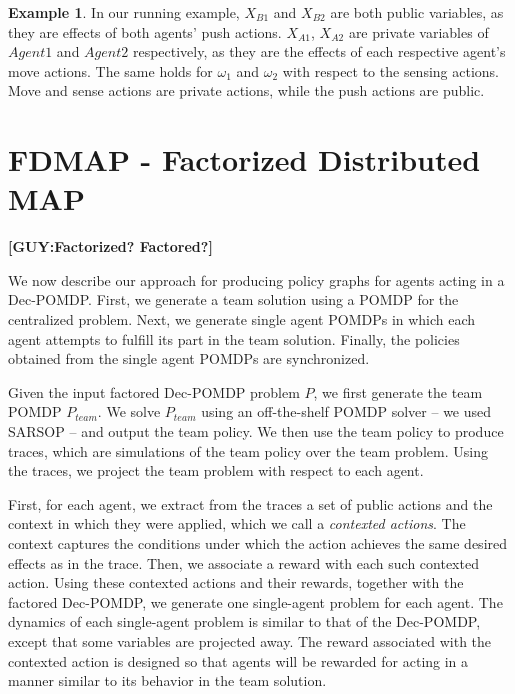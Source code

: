 \documentclass[letterpaper]{article} %
\theoremstyle{definition}
\newtheorem{example}{Example}
\newcommand{\commentout}[1]{}
\newcommand{\guy}[1]{\textbf{[\color{orange}GUY:#1]}}
\begin{document}
\begin{example}
In our running example, $X_{B1}$ and $X_{B2}$ are both public variables, as they are effects of both agents' push actions.
$X_{A1}$, $X_{A2}$ are private variables of $Agent1$ and $Agent2$ respectively, as they are the effects of each respective agent's move actions. The same holds for $\omega_1$ and $\omega_2$ with respect to the sensing actions.
Move and sense actions are private actions, while the push actions are public.
\end{example}





\section{FDMAP - Factorized Distributed MAP}
\guy{Factorized? Factored?}

We now describe our approach for producing policy graphs for agents acting in a Dec-POMDP. First, we generate a team solution using a POMDP for the centralized problem. Next, we generate single agent POMDPs in which each agent attempts to fulfill its part in the team solution. Finally, the policies obtained from the single agent POMDPs are synchronized. 

\commentout{
Given the input factored Dec-POMDP problem $P$, we first generate the team POMDP $P_{team}$. $P_{team}$ is identical to $P$, ignoring the underlying multi-agent structure. That is, the actions are the joint actions and the observations are the joint observation, viewed as applied 
and observed by a single agent. Equivalently, this can be viewed as a Dec-POMDP in which all observations are communicated accurately and instantaneously to all agents.}

Given the input factored Dec-POMDP problem $P$, we first generate the team POMDP $P_{team}$. We solve $P_{team}$ using an off-the-shelf POMDP solver -- we used SARSOP \cite{SARSOP} -- and output the team policy. We then use the team policy to produce traces, which are simulations of the team policy over the team problem. Using the traces, we project the team problem with respect to each agent.

First, for each agent, we extract from the traces a set of public actions and the context in which they were applied, which we call a {\em contexted actions}. The context captures the conditions under which the action achieves the same desired effects as in the trace.
Then, we associate a reward with each such contexted action. Using these contexted actions and their rewards, together with the factored Dec-POMDP, we  generate
one single-agent problem for each agent. The dynamics of each single-agent problem is similar to that of the Dec-POMDP, except that some variables are projected away. The reward associated with the contexted action is designed so that agents will be rewarded for acting in a manner similar to its
behavior in the team solution.
\end{document}

